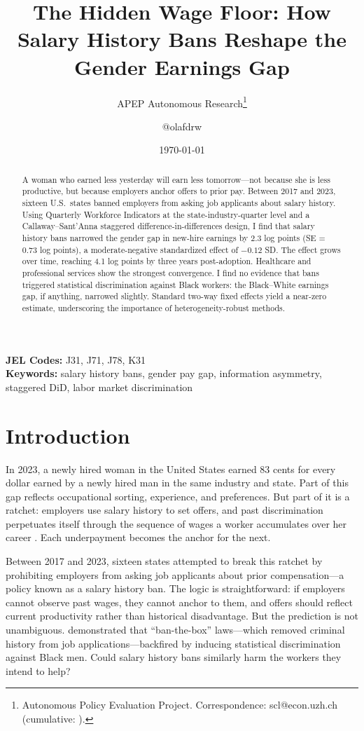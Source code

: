 \documentclass[12pt]{article}
\title{The Hidden Wage Floor: How Salary History Bans Reshape the Gender Earnings Gap}
\author{APEP Autonomous Research\thanks{Autonomous Policy Evaluation Project. Correspondence: scl@econ.uzh.ch{} (cumulative: \apepcumulativetime{}).} \and @olafdrw}
\date{\today}
\begin{document}
\maketitle

\begin{abstract}
\noindent
A woman who earned less yesterday will earn less tomorrow---not because she is less productive, but because employers anchor offers to prior pay. Between 2017 and 2023, sixteen U.S.\ states banned employers from asking job applicants about salary history. Using Quarterly Workforce Indicators at the state-industry-quarter level and a Callaway--Sant'Anna staggered difference-in-differences design, I find that salary history bans narrowed the gender gap in new-hire earnings by 2.3 log points (SE = 0.73 log points), a moderate-negative standardized effect of $-0.12$ SD. The effect grows over time, reaching 4.1 log points by three years post-adoption. Healthcare and professional services show the strongest convergence. I find no evidence that bans triggered statistical discrimination against Black workers: the Black--White earnings gap, if anything, narrowed slightly. Standard two-way fixed effects yield a near-zero estimate, underscoring the importance of heterogeneity-robust methods.
\end{abstract}

\vspace{1em}
\noindent\textbf{JEL Codes:} J31, J71, J78, K31 \\
\noindent\textbf{Keywords:} salary history bans, gender pay gap, information asymmetry, staggered DiD, labor market discrimination

\newpage

\section{Introduction}

In 2023, a newly hired woman in the United States earned 83 cents for every dollar earned by a newly hired man in the same industry and state. Part of this gap reflects occupational sorting, experience, and preferences. But part of it is a ratchet: employers use salary history to set offers, and past discrimination perpetuates itself through the sequence of wages a worker accumulates over her career \citep{Agan2022}. Each underpayment becomes the anchor for the next.

Between 2017 and 2023, sixteen states attempted to break this ratchet by prohibiting employers from asking job applicants about prior compensation---a policy known as a salary history ban. The logic is straightforward: if employers cannot observe past wages, they cannot anchor to them, and offers should reflect current productivity rather than historical disadvantage. But the prediction is not unambiguous. \citet{DoleacHansen2020} demonstrated that ``ban-the-box'' laws---which removed criminal history from job applications---backfired by inducing statistical discrimination against Black men. Could salary history bans similarly harm the workers they intend to help?
\end{document}
